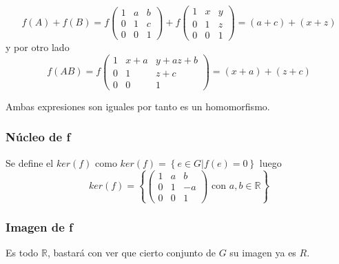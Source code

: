\documentclass[12pt]{article}
\begin{document}
    \begin{equation*}
        f(A)+ f(B)= 
        f 
        \begin{pmatrix}
            1 & a &  b\\
            0 & 1 & c\\
            0 & 0 & 1
            \end{pmatrix}
           +
            f %
        \begin{pmatrix}
            1 & x & y \\
            0 & 1 & z \\
            0 & 0 & 1
            \end{pmatrix}
            = (a+c)+(x + z) 
    \end{equation*}
    y por otro lado
    \begin{equation*}
        f(AB)= 
        f %
        \begin{pmatrix}
            1 & x+a & y + az + b\\
            0 & 1 & z + c\\
            0 & 0 & 1
            \end{pmatrix}
            = (x+a)+(z+c) 
    \end{equation*}
    
    Ambas expresiones son iguales por tanto es un homomorfismo. 

\subsubsection*{Núcleo de f}

Se define el $ker(f)$  como   $ker(f) = \left\{ e \in G | f(e) = 0\right\}$
luego 
\begin{equation*}
    ker(f) = \left\{ \begin{pmatrix}
        1 & a & b \\
        0 & 1 & -a \\
        0 & 0 & 1
        \end{pmatrix} \text{ con  } a,b \in \mathbb R\right\}
\end{equation*}

\subsubsection*{Imagen de f}

Es todo $\mathbb R$, bastará con ver que cierto conjunto de $G$
su imagen ya es $R.$
\end{document}
